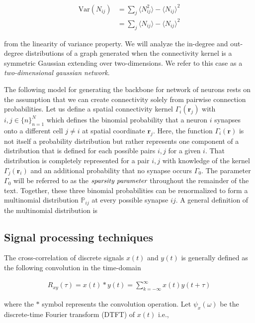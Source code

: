 \documentclass{ucetd}
\begin{document}
\begin{align}
\mathrm{Var}(N_{ij}) &= \sum_{j} \langle N_{ij}^{2} \rangle - \langle N_{ij} \rangle ^{2} \\
&= \sum_{j} \langle N_{ij}\rangle - \langle N_{ij} \rangle ^{2} 
\end{align}

from the linearity of variance property. We will analyze the in-degree and out-degree distributions of a graph generated when the connectivity kernel is a symmetric Gaussian extending over two-dimensions. We refer to this case as a \emph{two-dimensional gaussian network}.

The following model for generating the backbone for network of neurons rests on the assumption that we can create connectivity solely from pairwise connection probabilities. Let us define a spatial connectivity kernel $\Gamma_{i}(\mathbf{r}_{j})$ with $i,j\in \{n\}_{n=1}^{N}$ which defines the binomial probability that a neuron $i$ synapses onto a different cell $j\neq i$ at spatial coordinate $\mathbf{r}_{j}$. Here, the function $\Gamma_{i}(\mathbf{r})$ is not itself a probability distribution but rather represents one component of a distribution that is defined for each possible pairs $i,j$ for a given $i$. That distribution is completely represented for a pair $i,j$ with knowledge of the kernel $\Gamma_{j}(\mathbf{r}_{i})$ and an additional probability that no synapse occurs $\Gamma_{0}$. The parameter $\Gamma_{0}$ will be referred to as the $\emph{sparsity parameter}$ throughout the remainder of the text. Together, these three binomial probabilities can be renormalized to form a multinomial distribution $\mathbb{P}_{ij}$ at every possible synapse $ij$. A general definition of the multinomial distribution is

\subsection{Signal processing techniques}

The cross-correlation of discrete signals $x(t)$ and $y(t)$ is generally defined as the following convolution in the time-domain

\begin{align}
R_{xy}(\tau) = x(t) * y(t) = \sum_{k =-\infty}^{\infty}x(t)y(t+\tau)
\end{align}

where the $*$ symbol represents the convolution operation. Let $\psi_{x}(\omega)$ be the discrete-time Fourier transform (DTFT) of $x(t)$ i.e.,
\end{document}
